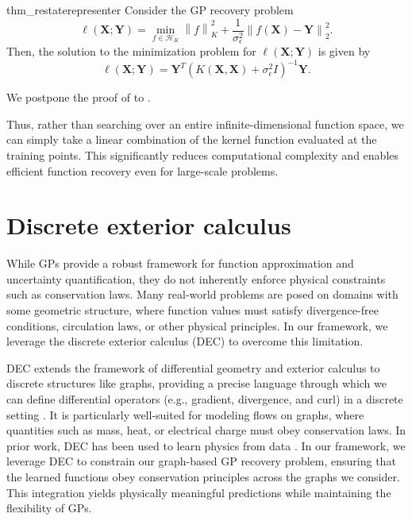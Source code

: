 \documentclass{article}
\theoremstyle{definition}
\theoremstyle{remark}
\newcommand{\norm}[1]{\left \lVert #1 \right \rVert}
\begin{document}
\begin{restatable}[]{thm_restate}{representer}
\label{thm:inner_min}
Consider the GP recovery problem
\begin{equation} 
	\ell(\mathbf{X}; \mathbf{Y}) = \min_{f \in \mathcal{H}_K}  \norm{f}_K^2 +\frac{1}{\sigma_{\epsilon}^2} \norm{ f\left( \mathbf{X} \right) - \mathbf{Y} }_2^2.
\end{equation}
Then, the solution to the minimization problem for $\ell(\mathbf{X}; \mathbf{Y})$ is given by
\begin{equation}
\ell(\mathbf{X}; \mathbf{Y}) =  \mathbf{Y}^T \left(K(\mathbf{X},\mathbf{X})+ \sigma_{\epsilon}^2 I\right)^{-1} \mathbf{Y}.
\end{equation}
\end{restatable}
We postpone the proof of  to .

Thus, rather than searching over an entire infinite-dimensional function space, we can simply take a linear combination of the kernel function evaluated at the training points. This significantly reduces computational complexity and enables efficient function recovery even for large-scale problems.

\section{Discrete exterior calculus}\label{sec:DEC}

While GPs provide a robust framework for function approximation and uncertainty quantification, they do not inherently enforce physical constraints such as conservation laws. Many real-world problems are posed on domains with some geometric structure, where function values must satisfy divergence-free conditions, circulation laws, or other physical principles. In our framework, we leverage the discrete exterior calculus (DEC) to overcome this limitation.

DEC extends the framework of differential geometry and exterior calculus to discrete structures like graphs, providing a precise language through which we can define differential operators (e.g., gradient, divergence, and curl) in a discrete setting \cite{desbrun_kanso_tong_2008,hirani_thesis_2003}. It is particularly well-suited for modeling flows on graphs, where quantities such as mass, heat, or electrical charge must obey conservation laws. In prior work, DEC has been used to learn physics from data \cite{TRASK2022110969}. In our framework, we leverage DEC to constrain our graph-based GP recovery problem, ensuring that the learned functions obey conservation principles across the graphs we consider. This integration yields physically meaningful predictions while maintaining the flexibility of GPs.
\end{document}
